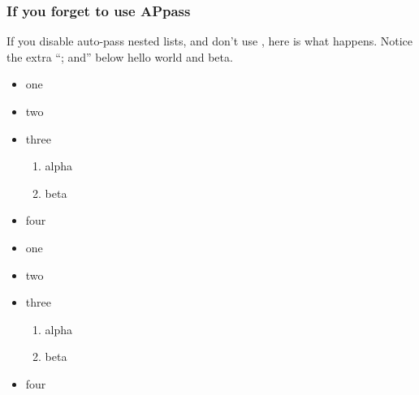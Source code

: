 \documentclass[11pt,parskip=half]{scrartcl}
\newcommand{\cmd}[1]{\texttt{\detokenize{#1}}}
\begin{document}
\subsubsection{If you forget to use APpass}
If you disable auto-pass nested lists, and don't use \cmd{\APpass}, here is what happens. Notice the extra ``; and'' below hello world and beta.
\begin{LTXexample}
\disableAPautopassnest
\begin{itemize}[autopunc]
    \item one
    \item two
    \item three
    \begin{enumerate}[autopunc]
        \item alpha
        \item beta
    \end{enumerate}
    \item four
\end{itemize}
\end{LTXexample}

\begin{LTXexample}
\enableAPautopassnest
\begin{itemize}[autopunc]
    \item one
    \item two
    \item three
    \begin{enumerate}
        \item alpha
        \item beta
    \end{enumerate}
    \item four
\end{itemize}
\end{LTXexample}
\end{document}
